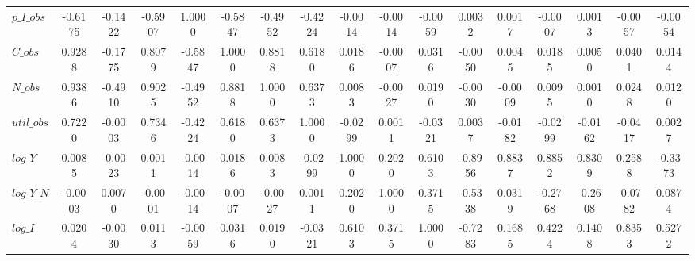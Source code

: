 \begin{center}
\begin{longtable}{lcccccccccccccccc}
$p\_I\_obs       $	 & 	           -0.6175	 & 	           -0.1422	 & 	           -0.5907	 & 	            1.0000	 & 	           -0.5847	 & 	           -0.4952	 & 	           -0.4224	 & 	           -0.0014	 & 	           -0.0014	 & 	           -0.0059	 & 	            0.0032	 & 	            0.0017	 & 	           -0.0007	 & 	            0.0013	 & 	           -0.0057	 & 	           -0.0054 \\ 
$C\_obs          $	 & 	            0.9288	 & 	           -0.1775	 & 	            0.8079	 & 	           -0.5847	 & 	            1.0000	 & 	            0.8818	 & 	            0.6180	 & 	            0.0186	 & 	           -0.0007	 & 	            0.0316	 & 	           -0.0050	 & 	            0.0045	 & 	            0.0185	 & 	            0.0050	 & 	            0.0401	 & 	            0.0144 \\ 
$N\_obs          $	 & 	            0.9386	 & 	           -0.4910	 & 	            0.9025	 & 	           -0.4952	 & 	            0.8818	 & 	            1.0000	 & 	            0.6373	 & 	            0.0083	 & 	           -0.0027	 & 	            0.0190	 & 	           -0.0030	 & 	           -0.0009	 & 	            0.0095	 & 	            0.0010	 & 	            0.0248	 & 	            0.0120 \\ 
$util\_obs       $	 & 	            0.7220	 & 	           -0.0003	 & 	            0.7346	 & 	           -0.4224	 & 	            0.6180	 & 	            0.6373	 & 	            1.0000	 & 	           -0.0299	 & 	            0.0011	 & 	           -0.0321	 & 	            0.0037	 & 	           -0.0182	 & 	           -0.0299	 & 	           -0.0162	 & 	           -0.0417	 & 	            0.0027 \\ 
$log\_Y          $	 & 	            0.0085	 & 	           -0.0023	 & 	            0.0011	 & 	           -0.0014	 & 	            0.0186	 & 	            0.0083	 & 	           -0.0299	 & 	            1.0000	 & 	            0.2020	 & 	            0.6103	 & 	           -0.8956	 & 	            0.8837	 & 	            0.8852	 & 	            0.8309	 & 	            0.2588	 & 	           -0.3373 \\ 
$log\_Y\_N       $	 & 	           -0.0003	 & 	            0.0070	 & 	           -0.0001	 & 	           -0.0014	 & 	           -0.0007	 & 	           -0.0027	 & 	            0.0011	 & 	            0.2020	 & 	            1.0000	 & 	            0.3715	 & 	           -0.5338	 & 	            0.0319	 & 	           -0.2768	 & 	           -0.2608	 & 	           -0.0782	 & 	            0.0874 \\ 
$log\_I          $	 & 	            0.0204	 & 	           -0.0030	 & 	            0.0113	 & 	           -0.0059	 & 	            0.0316	 & 	            0.0190	 & 	           -0.0321	 & 	            0.6103	 & 	            0.3715	 & 	            1.0000	 & 	           -0.7283	 & 	            0.1685	 & 	            0.4224	 & 	            0.1408	 & 	            0.8353	 & 	            0.5272 \\ 

\end{longtable}
\end{center}
